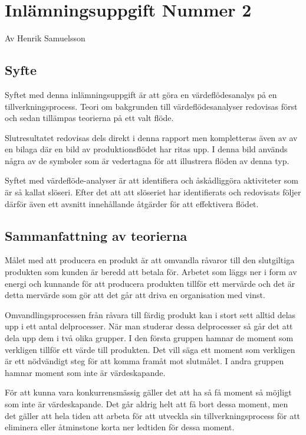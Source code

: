 \documentclass{article}
\begin{document}
\section*{Inlämningsuppgift Nummer 2}
Av Henrik Samuelsson
\subsection*{Syfte}
Syftet med denna inlämningsuppgift är att göra en värdeflödesanalys på en tillverkningsprocess. Teori om bakgrunden till värdeflödesanalyser redovisas först och sedan tillämpas teorierna på ett valt flöde.

Slutresultatet redovisas dels direkt i denna rapport men kompletteras även av av en bilaga där en bild av produktionsflödet har ritas upp. I denna bild används några av de symboler som är vedertagna för att illustrera flöden av denna typ.

Syftet med värdeflöde-analyser är att identifiera och åskådliggöra aktiviteter som är så kallat slöseri. Efter det att att slöseriet har identifierats och redovisats följer därför även ett avsnitt innehållande åtgärder för att effektivera flödet.

\subsection*{Sammanfattning av teorierna}
Målet med att producera en produkt är att omvandla råvaror till den slutgiltiga produkten som kunden är beredd att betala för. Arbetet som läggs ner i form av energi och kunnande för att producera produkten tillför ett mervärde och det är detta mervärde som gör att det går att driva en organisation med vinst.

Omvandlingsprocessen från råvara till färdig produkt kan i stort sett alltid delas upp i ett antal delprocesser. När man studerar dessa delprocesser så går det att dela upp dem i två olika grupper. I den första gruppen hamnar de moment som verkligen tillför ett värde till produkten. Det vill säga ett moment som verkligen är ett nödvändigt steg för att komma framåt mot slutmålet. I andra gruppen hamnar moment som inte är värdeskapande.

För att kunna vara konkurrensmässig gäller det att ha så få moment så möjligt som inte är värdeskapande. Det går aldrig helt att få bort dessa moment, men det gäller att hela tiden att arbeta för att utveckla sin tillverkningsprocess för att eliminera eller åtminstone korta ner ledtiden för dessa moment. 
\end{document}
